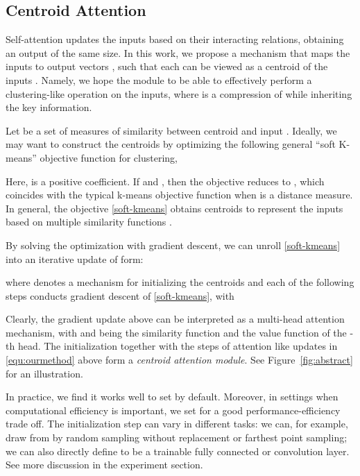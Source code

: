 \documentclass[english]{article}
\begin{document}
\iffalse 

\fi 


\subsection{Centroid Attention} \label{sec:centroid}
Self-attention updates the inputs  based on their interacting relations, 
obtaining an output of the same size. 
In this work, 
we propose a mechanism that maps the  inputs  to  output vectors , such that each  can be viewed as a centroid of the inputs . Namely, we hope the module to be able to effectively perform a  clustering-like operation on the inputs, where   is a compression of  while inheriting the key information. 



Let  be a set of measures of similarity between centroid  and input . 
Ideally, we may want to construct the centroids by optimizing the following 
general ``soft K-means'' 
objective function for clustering,

Here,  is a positive coefficient. 
If  and , then the objective reduces to , which coincides with the typical k-means objective function when  is a distance measure. 
In general, the objective 
\eqref{soft-kmeans} 
obtains centroids to represent the inputs 
based on multiple similarity functions . 


By solving the optimization  with gradient descent, we can unroll \eqref{soft-kmeans} into an iterative update of form: 
 
where  denotes a mechanism for initializing the centroids and each of the following  steps conducts gradient descent of \eqref{soft-kmeans}, with
 
 Clearly, the gradient update above can be interpreted as a multi-head attention mechanism, 
 with  and  being the similarity function and the value function of the -th head. 
 The initialization  together with the  steps of attention like updates in \eqref{equ:ourmethod} above form a \emph{centroid attention module}. 
 See Figure~\ref{fig:abstract} for an illustration. 
 
 
 In practice, we find it works well to 
  set  by default. Moreover, 
  in settings when computational efficiency is important, we set  for a good performance-efficiency trade off. 
The initialization step can vary in different tasks: 
  we can, for example, draw 
    from 
  by random sampling without replacement or farthest point sampling; we can also directly define  to be a trainable fully connected or convolution layer. 
See more discussion in the experiment section.
\end{document}

